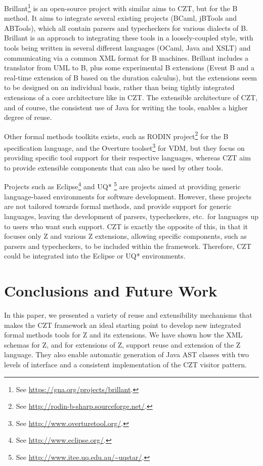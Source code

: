 \documentclass{llncs}
\begin{document}
  Brillant\footnote{See \url{https://gna.org/projects/brillant}.}  is
  an open-source project with similar aims to CZT, but for the B
  method. It aims to integrate several existing projects (BCaml,
  jBTools and ABTools), which all contain parsers and typecheckers for
  various dialects of B.  Brillant is an approach to integrating these
  tools in a loosely-coupled style, with tools being written in
  several different languages (OCaml, Java and XSLT) and communicating
  via a common XML format for B machines.  Brillant includes a
  translator from UML to B, plus some experimental B extensions (Event
  B and a real-time extension of B based on the duration calculus),
  but the extensions seem to be designed on an individual basis,
  rather than being tightly integrated extensions of a core
  architecture like in CZT.  The extensible architecture of CZT, and
  of course, the consistent use of Java for writing the
  tools, enables a higher degree of reuse.

  Other formal methods toolkits exists, such as RODIN
  project\footnote{See \url{http://rodin-b-sharp.sourceforge.net/}.}
  for the B specification language, and the Overture
  toolset\footnote{See \url{http://www.overturetool.org/}.} for VDM,
  but they focus on providing specific tool support for their
  respective languages, whereas CZT aim to provide extensible
  components that can also be used by other tools.

  Projects such as Eclipse\footnote{See
  \url{http://www.eclipse.org/}.}  and UQ* \footnote{See
  \url{http://www.itee.uq.edu.au/~uqstar/}.} are projects aimed at
  providing generic language-based environments for software
  development. However, these projects are not tailored towards formal
  methods, and provide support for generic languages, leaving the
  development of parsers, typecheckers, etc.\ for languages up to
  users who want such support. CZT is exactly the opposite of this, in
  that it focuses only Z and various Z extensions, allowing specific
  components, such as parsers and typecheckers, to be included within
  the framework. Therefore, CZT could be integrated into the Eclipse
  or UQ* environments.

\section{Conclusions and Future Work} \label{sec:conclusions}

  In this paper, we presented a variety of reuse and extensibility
  mechanisms that makes the CZT framework an ideal starting point to
  develop new integrated formal methods tools for Z and its
  extensions.  We have shown how the XML schemas for Z, and for
  extensions of Z, support reuse and extension of the Z language.
  They also enable automatic generation of Java AST classes with two
  levels of interface and a consistent implementation of the CZT visitor
  pattern.
\end{document}
